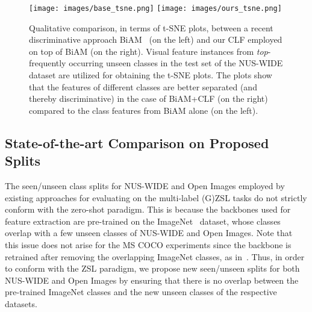 \documentclass[10pt,journal,compsoc]{IEEEtran}
\begin{document}
\begin{figure}[t]
    \centering
    \texttt{[image: images/base\_tsne.png]}
    \texttt{[image: images/ours\_tsne.png]}
    \caption{Qualitative comparison, in terms of t-SNE plots, between a recent discriminative approach BiAM~\cite{narayan2021discriminative} (on the left) and our CLF employed on top of BiAM (on the right). Visual feature instances from \textit{top}- frequently occurring unseen classes in the test set of the NUS-WIDE dataset are utilized for obtaining the t-SNE plots. The plots show that the features of different classes are better separated (and thereby discriminative) in the case of BiAM+CLF (on the right) compared to the class features from BiAM alone (on the left).}
    \label{fig:qual_tsne}
\end{figure}




































\subsection{State-of-the-art Comparison on Proposed Splits \label{sec:sota_new_splits}}

The seen/unseen class splits \cite{zhang2016fast,huynh2020shared} for NUS-WIDE and Open Images employed by existing approaches for evaluating on the multi-label (G)ZSL tasks do not strictly conform with the zero-shot paradigm. This is because the backbones used for feature extraction are pre-trained on the ImageNet~\cite{imagenet} dataset, whose classes overlap with a few unseen classes of NUS-WIDE and Open Images. Note that this issue does not arise for the MS COCO experiments since the backbone is retrained after removing the overlapping ImageNet classes, as in~\cite{hayat2020synthesizing}. Thus, in order to conform with the ZSL paradigm, we propose new seen/unseen splits for both NUS-WIDE and Open Images by ensuring that there is no overlap between the pre-trained ImageNet classes and the new unseen classes of the respective datasets. 
\end{document}
